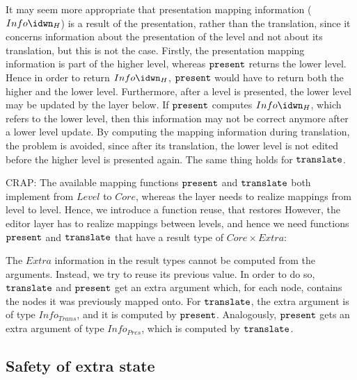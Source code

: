 It may seem more appropriate that presentation mapping information ($Info\idwn_{H}$) is a result of the presentation, rather than the translation, since it concerns information about the presentation of the level and not about its translation, but this is not the case. Firstly, the presentation mapping information is part of the higher level, whereas ${\tt present}$ returns the lower level. Hence in order to return $Info\idwn_{H}$, ${\tt present}$ would have to return both the higher and the lower level.  Furthermore, after a level is presented, the lower level may be updated by the layer below. If ${\tt present}$ computes $Info\idwn_{H}$, which refers to the lower level, then this information may not be correct anymore after a lower level update. By computing the mapping information during translation, the problem is avoided, since after its translation, the lower level is not edited before the higher level is presented again. The same thing holds for ${\tt translate}$.



\bc CRAP:
The available mapping functions ${\tt present}$ and ${\tt translate}$ both implement from $Level$ to $Core$, whereas the layer needs to realize mappings from level to level. Hence, we introduce a function reuse, that restores However, the editor layer has to realize mappings between levels, and hence we need functions ${\tt present}$ and ${\tt translate}$ that have a result type of $Core \times Extra$:

The $Extra$ information in the result types cannot be computed from the arguments. Instead, we try to reuse its previous value. In order to do so, ${\tt translate}$ and ${\tt present}$ get an extra argument which, for each node, contains the nodes it was previously mapped onto. For ${\tt translate}$, the extra argument is of type $Info_{Trans}$, and it is computed by ${\tt present}$. Analogously, ${\tt present}$ gets an extra argument of type $Info_{Pres}$, which is computed by ${\tt translate}$. 
\ec

%																
\subsection{Safety of extra state}

